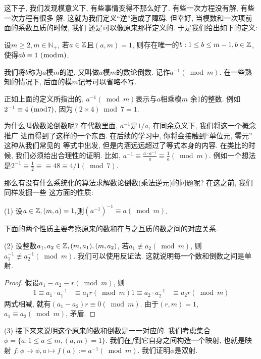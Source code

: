 这下子, 我们发现模意义下, 有些事情变得不那么好了. 有些一次方程没有解, 有些一次方程有很多
解. 这就为我们定义``逆''造成了障碍. 但幸好, 当模数和一次项前面的系数互质的时候, 我们
还是可以像原来那样定义的. 于是我们给出如下的定义: 

\begin{definition}
    设$m\geq 2, m\in \mathbb N_+$, 若$a\in{\mathbb Z}$且$(a,m)=1$, 则存在唯一的$b:1\leq
    b\leq m-1, b\in {\mathbb Z}$, 使得${ab} \equiv {1} ~(\bmod {m})$. 

    我们将$b$称为$a$模$m$的逆, 又叫做$a$模$m$的数论倒数. 记作$a^{-1} (\bmod m)$.
    在一些熟知的情况下, 后面的模$m$记号可以省略不写. 
\end{definition}

 正如上面的定义所指出的, $a^{-1}(\bmod m)$表示与$a$相乘模$m$
余1的整数. 例如${2^{-1}} \equiv {4} ~(\bmod {7})$, 因为$(2\times 4)\bmod 7=1.$ 

为什么叫做数论倒数呢? 在代数里面, $a^{-1}$是$1/a$, 在同余意义下, 我们将这一个概念推广
进而得到了这样的一个东西. 在后续的学习中, 你将会接触到``单位元, 零元''
这种从我们常见的
等式中出发, 但是内涵远远超过了等式本身的内容. 在类比的时候, 我们必须给出合理性的证明. 
比如, $a^{-1}\equiv \frac{a\cdot a^{-1}}{a}\equiv \frac 1a (\bmod m)$. 
例如一个想法是$2^{-1}\equiv \frac12 \equiv \equiv 48\equiv 4/1(\bmod 7)$. 

那么有没有什么系统化的算法求解数论倒数(乘法逆元)的问题呢? 在这之前, 我们同样发掘一些
这方面的性质: 

(1) 设$a\in {\mathbb Z},(m,a)=1, $则$(a^{-1})^{-1}\equiv a (\bmod m)$. 

下面的两个性质主要考察原来的数和在与之互质的数之间的对应关系. 

(2) 设整数$a_1, a_2\in {\mathbb Z}, (m, a_1), (m, a_2)$, 若${a_1}\not \equiv{a_2} 
(\bmod m)$, 则$a_1^{-1}\not \equiv a_2^{-1}(\bmod m)$. 我们可以使用反证法. 
这就说明每一个数和倒数之间是单射. 

\begin{proof}
    假设$a_1\equiv a_2\equiv r (\bmod m)$, 则
    \begin{align*}
        1\equiv a_1\cdot a_1^{-1} & \equiv a_1r (\bmod m)
        1\equiv a_2\cdot a_2^{-1} & \equiv a_2r (\bmod m)
    \end{align*}
    两式相减, 就有$(a_1-a_2)r\equiv 0 (\bmod m)$. 由于$(r,m)=1,$ 
    $a_1\equiv a_2 (\bmod m)$, 矛盾. 
\end{proof}

(3) 接下来来说明这个原来的数和倒数是一一对应的. 我们考虑集合$\phi=\{a: 
1\leq a\leq m, (a,m)=1\}$. 我们在$f$到它自身之间构造一个映射, 也就是映射 
$f:\phi \to \phi, a\mapsto f(a):=a^{-1} (\bmod m)$. 我们证明$\phi$是双射.

